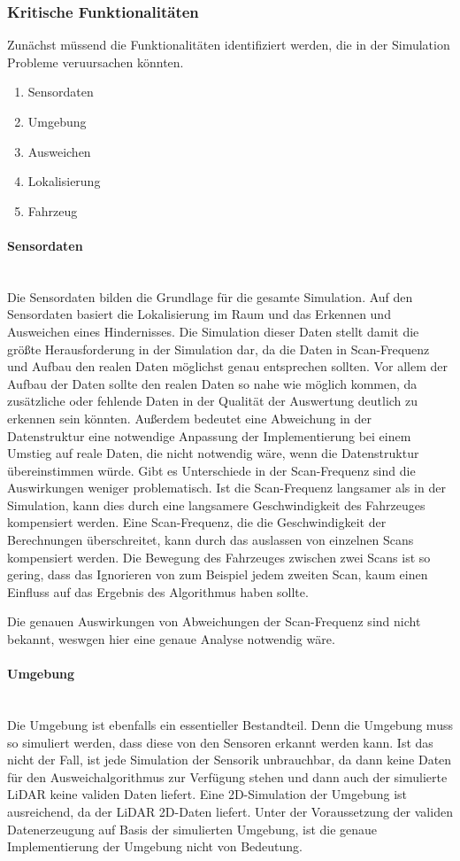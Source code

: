 \subsubsection{Kritische Funktionalitäten}
Zunächst müssend die Funktionalitäten identifiziert werden, die in der Simulation Probleme veruursachen könnten.
\begin{enumerate}
    \item Sensordaten
    \item Umgebung 
    \item Ausweichen
    \item Lokalisierung
    \item Fahrzeug
\end{enumerate}

\paragraph{Sensordaten} \mbox{}\\
Die Sensordaten bilden die Grundlage für die gesamte Simulation. 
Auf den Sensordaten basiert die Lokalisierung im Raum und das Erkennen und Ausweichen eines Hindernisses. 
Die Simulation dieser Daten stellt damit die größte Herausforderung in der Simulation dar, 
da die Daten in Scan-Frequenz und Aufbau den realen Daten möglichst genau entsprechen sollten.
Vor allem der Aufbau der Daten sollte den realen Daten so nahe wie möglich kommen, 
da zusätzliche oder fehlende Daten in der Qualität der Auswertung deutlich zu erkennen sein könnten. 
Außerdem bedeutet eine Abweichung in der Datenstruktur eine notwendige Anpassung der Implementierung bei einem Umstieg auf reale Daten, 
die nicht notwendig wäre, wenn die Datenstruktur übereinstimmen würde.
Gibt es Unterschiede in der Scan-Frequenz sind die Auswirkungen weniger problematisch. 
Ist die Scan-Frequenz langsamer als in der Simulation, kann dies durch eine langsamere Geschwindigkeit des Fahrzeuges kompensiert werden.
Eine Scan-Frequenz, die die Geschwindigkeit der Berechnungen überschreitet, kann durch das auslassen von einzelnen Scans kompensiert werden.
Die Bewegung des Fahrzeuges zwischen zwei Scans ist so gering, dass das Ignorieren von zum Beispiel jedem zweiten Scan,
kaum einen Einfluss auf das Ergebnis des Algorithmus haben sollte. 

Die genauen Auswirkungen von Abweichungen der Scan-Frequenz sind nicht bekannt, weswgen hier eine genaue Analyse notwendig wäre.

\paragraph{Umgebung} \mbox{}\\
Die Umgebung ist ebenfalls ein essentieller Bestandteil. 
Denn die Umgebung muss so simuliert werden, dass diese von den Sensoren erkannt werden kann. 
Ist das nicht der Fall, ist jede Simulation der Sensorik unbrauchbar, 
da dann keine Daten für den Ausweichalgorithmus zur Verfügung stehen und dann auch der simulierte LiDAR keine validen Daten liefert.
Eine 2D-Simulation der Umgebung ist ausreichend, da der LiDAR 2D-Daten liefert.
Unter der Voraussetzung der validen Datenerzeugung auf Basis der simulierten Umgebung, 
ist die genaue Implementierung der Umgebung nicht von Bedeutung. 

